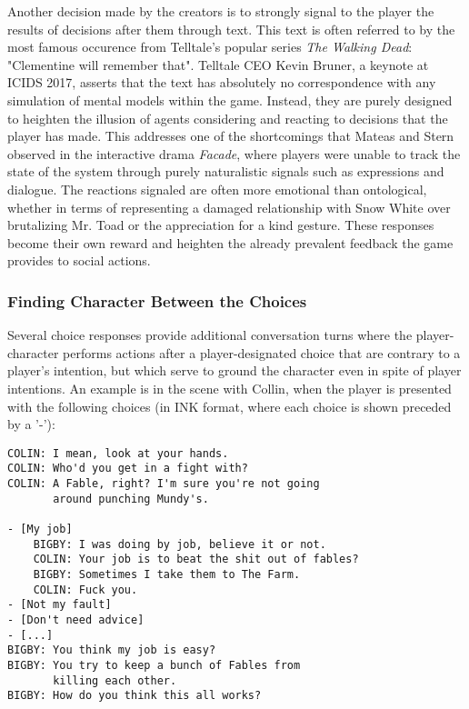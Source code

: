 Another decision made by the creators is to strongly signal to the
player the results of decisions after them through text. This text is
often referred to by the most famous occurence from Telltale's popular
series \emph{The Walking Dead}: "Clementine will remember that". Telltale
CEO Kevin Bruner, a keynote at ICIDS 2017, asserts that the text has
absolutely no correspondence with any simulation of mental models
within the game. Instead, they are purely designed to heighten the
illusion of agents considering and reacting to decisions that the
player has made. This addresses one of the shortcomings that Mateas
and Stern observed in the interactive drama \emph{Facade}\cite{Mateas2005},
where players were unable to track the state of the system through
purely naturalistic signals such as expressions and dialogue. The
reactions signaled are often more emotional than ontological, whether
in terms of representing a damaged relationship with Snow White over
brutalizing Mr. Toad or the appreciation for a kind gesture. These
responses become their own reward and heighten the already prevalent
feedback the game provides to social actions.

\subsubsection{Finding Character Between the Choices}
\label{sec:orgheadline8}
Several choice responses provide additional conversation turns where
the player-character performs actions after a player-designated choice
that are contrary to a player's intention, but which serve to ground
the character even in spite of player intentions. An example is in the
scene with Collin, when the player is presented with the following
choices (in INK format, where each choice is shown preceded by a '-'):

\begin{verbatim}
COLIN: I mean, look at your hands.
COLIN: Who'd you get in a fight with? 
COLIN: A Fable, right? I'm sure you're not going
       around punching Mundy's.

- [My job]
    BIGBY: I was doing by job, believe it or not.
    COLIN: Your job is to beat the shit out of fables?
    BIGBY: Sometimes I take them to The Farm.
    COLIN: Fuck you.
- [Not my fault]
- [Don't need advice]
- [...]
BIGBY: You think my job is easy? 
BIGBY: You try to keep a bunch of Fables from 
       killing each other. 
BIGBY: How do you think this all works?
\end{verbatim}


